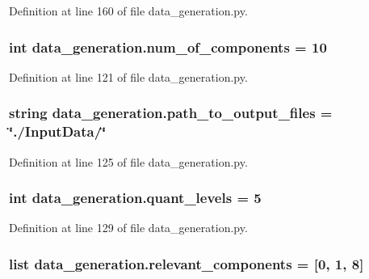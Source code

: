 Definition at line 160 of file data\+\_\+generation.\+py.

\hypertarget{namespacedata__generation_ad68308d6e9bf4bd2485a44ce0c52315c}{
\subsubsection[{num\+\_\+of\+\_\+components}]{\setlength{\rightskip}{0pt plus 5cm}int data\+\_\+generation.\+num\+\_\+of\+\_\+components = 10}}\label{namespacedata__generation_ad68308d6e9bf4bd2485a44ce0c52315c}


Definition at line 121 of file data\+\_\+generation.\+py.

\hypertarget{namespacedata__generation_ad7ee72f39a9a602967e77e4da382566a}{
\subsubsection[{path\+\_\+to\+\_\+output\+\_\+files}]{\setlength{\rightskip}{0pt plus 5cm}string data\+\_\+generation.\+path\+\_\+to\+\_\+output\+\_\+files = \char`\"{}./Input\+Data/\char`\"{}}}\label{namespacedata__generation_ad7ee72f39a9a602967e77e4da382566a}


Definition at line 125 of file data\+\_\+generation.\+py.

\hypertarget{namespacedata__generation_adf1cda3bf67a0646998d7ad03f8d1337}{
\subsubsection[{quant\+\_\+levels}]{\setlength{\rightskip}{0pt plus 5cm}int data\+\_\+generation.\+quant\+\_\+levels = 5}}\label{namespacedata__generation_adf1cda3bf67a0646998d7ad03f8d1337}


Definition at line 129 of file data\+\_\+generation.\+py.

\hypertarget{namespacedata__generation_afa9b1b91a7860372739bca028f41263b}{
\subsubsection[{relevant\+\_\+components}]{\setlength{\rightskip}{0pt plus 5cm}list data\+\_\+generation.\+relevant\+\_\+components = \mbox{[}0, 1, 8\mbox{]}}}\label{namespacedata__generation_afa9b1b91a7860372739bca028f41263b}


